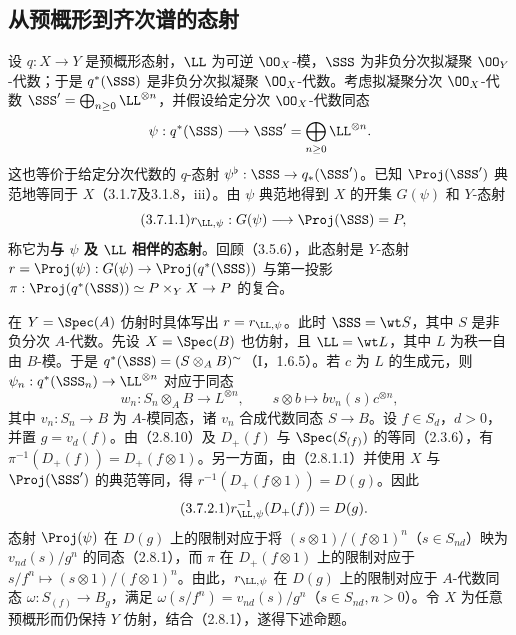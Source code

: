 \subsection{从预概形到齐次谱的态射}
设 $q:X\to Y$ 是预概形态射，$\LL$ 为可逆 $\OO_X$-模，$\SSS$ 为非负分次拟凝聚 $\OO_Y$-代数；于是 $q^*(\SSS)$ 是非负分次拟凝聚 $\OO_X$-代数。考虑拟凝聚分次 $\OO_X$-代数
$\SSS'=\bigoplus_{n\geq0}\LL^{\otimes n}$，并假设给定分次 $\OO_X$-代数同态
\[
\psi:q^*(\SSS)\longrightarrow\SSS'=\bigoplus_{n\geq0}\LL^{\otimes n}.
\]
这也等价于给定分次代数的 $q$-态射 $\psi^\flat:\SSS\to q_*(\SSS')$。已知 $\Proj(\SSS')$ 典范地等同于 $X$（3.1.7及3.1.8，iii）。由 $\psi$ 典范地得到 $X$ 的开集 $G(\psi)$ 和 $Y$-态射
\begin{equation}\tag{3.7.1.1}r_{\LL,\psi}:G(\psi)\longrightarrow\Proj(\SSS)=P,\end{equation}
称它为\textbf{与 $\psi$ 及 $\LL$ 相伴的态射}。回顾（3.5.6），此态射是 $Y$-态射
$r=\Proj(\psi):G(\psi)\to\Proj(q^*(\SSS))$ 与第一投影
$\pi:\Proj(q^*(\SSS))\simeq P\times_Y X\to P$ 的复合。

在 $Y=\Spec(A)$ 仿射时具体写出 $r=r_{\LL,\psi}$。此时 $\SSS=\wt S$，其中 $S$ 是非负分次 $A$-代数。先设 $X=\Spec(B)$ 也仿射，且 $\LL=\wt L$，其中 $L$ 为秩一自由 $B$-模。于是 $q^*(\SSS)=(S\otimes_A B)^\sim$（I，1.6.5）。若 $c$ 为 $L$ 的生成元，则
$\psi_n:q^*(\SSS_n)\to\LL^{\otimes n}$ 对应于同态
\[
w_n:S_n\otimes_A B\longrightarrow L^{\otimes n},\qquad
s\otimes b\longmapsto bv_n(s)c^{\otimes n},
\]
其中 $v_n:S_n\to B$ 为 $A$-模同态，诸 $v_n$ 合成代数同态 $S\to B$。设 $f\in S_d$，$d>0$，并置 $g=v_d(f)$。由（2.8.10）及 $D_+(f)$ 与 $\Spec(S_{(f)})$ 的等同（2.3.6），有
$\pi^{-1}(D_+(f))=D_+(f\otimes1)$。另一方面，由（2.8.1.1）并使用 $X$ 与 $\Proj(\SSS')$ 的典范等同，得
$r^{-1}(D_+(f\otimes1))=D(g)$。因此
\begin{equation}\tag{3.7.2.1}r_{\LL,\psi}^{-1}(D_+(f))=D(g).\end{equation}
态射 $\Proj(\psi)$ 在 $D(g)$ 上的限制对应于将
$(s\otimes1)/(f\otimes1)^n$（$s\in S_{nd}$）映为 $v_{nd}(s)/g^n$ 的同态（2.8.1），而 $\pi$ 在 $D_+(f\otimes1)$ 上的限制对应于
$s/f^n\mapsto(s\otimes1)/(f\otimes1)^n$。由此，$r_{\LL,\psi}$ 在 $D(g)$ 上的限制对应于 $A$-代数同态
$\omega:S_{(f)}\to B_g$，满足
$\omega(s/f^n)=v_{nd}(s)/g^n$（$s\in S_{nd},n>0$）。令 $X$ 为任意预概形而仍保持 $Y$ 仿射，结合（2.8.1），遂得下述命题。

